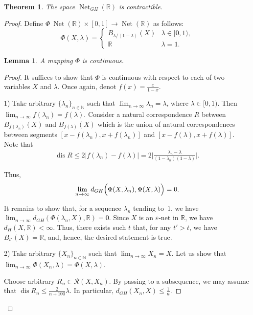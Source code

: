 \documentclass[10pt,a4paper]{amsart}
\newtheorem{lemma}{Lemma}
\newtheorem{theorem}{Theorem}
\newcommand{\N}{\mathbb{N}}
\newcommand{\R}{\mathbb{R}}
\newcommand{\dis}{\operatorname{dis}}
\newcommand{\nets}{\operatorname{Net}}
\begin{document}
\begin{theorem}
The space $\nets_{GH}(\R)$ is contractible.
\end{theorem}

\begin{proof}
Define $\Phi\: \nets(\R)\times [0, 1]\to \nets(\R)$ as follows: $$\Phi(X, \lambda) = \begin{cases}B_{\lambda/(1-\lambda)}(X) & \lambda\in[0, 1),\\ \R &\lambda = 1.\end{cases}$$ 

\begin{lemma}\label{lemma:contraction}
A mapping $\Phi$ is continuous. 
\end{lemma}

\begin{proof}
It suffices to show that $\Phi$ is continuous with respect to each of two variables $X$ and $\lambda$. Once again, denot $f(x) = \frac{x}{1-x}$.

1) Take arbitrary $\{\lambda_n\}_{n\in\N}$ such that $\displaystyle \lim_{n\to\infty}\lambda_n = \lambda$, where $\lambda\in[0, 1)$. Then $\displaystyle \lim_{n\to\infty}f(\lambda_n) = f(\lambda)$. Consider a natural correspondence $R$ between $B_{f(\lambda_n)}(X)$ and $B_{f(\lambda)}(X)$ which is the union of natural correspondences between segments $[x- f(\lambda_n), x+f(\lambda_n)]$ and $[x-f(\lambda), x + f(\lambda)]$. Note that 
\begin{align*}
\dis R\le 2|f(\lambda_n) - f(\lambda)| = 2\Big|\frac{\lambda_n - \lambda}{(1-\lambda_n)(1-\lambda)}\Big|. 
\end{align*}
 
Thus, $$\lim_{n\to\infty}d_{GH}\Bigl(\Phi(X,\lambda_n), \Phi(X, \lambda)\Bigr) = 0.$$

It remains to show that, for a sequence $\lambda_n$ tending to~$1$, we have $\displaystyle\lim_{n\to\infty} d_{GH}(\Phi(\lambda_n, X), \R) = 0$. Since $X$ is an $\varepsilon$-net in $\R$, we have $d_H(X, \R)<\infty$. Thus, there exists such $t$ that, for any $t' > t$, we have $B_{t'}(X) = \R$, and, hence, the desired statement is true.

2) Take arbitrary $\{X_n\}_{n\in\N}$ such that $\displaystyle \lim_{n\to\infty}X_n = X$. Let us show that $\displaystyle \lim_{n\to\infty}\Phi(X_n, \lambda) = \Phi(X,\lambda)$.

Choose arbitrary $R_n\in\mathcal{R}(X, X_n)$. By passing to a subsequence, we may assume that $\dis R_n \le \frac{2}{n+100}\lambda$. In particular, $d_{GH}(X_n, X)\le \frac{1}{n}$.


\end{proof}
\end{proof}
\end{document}
